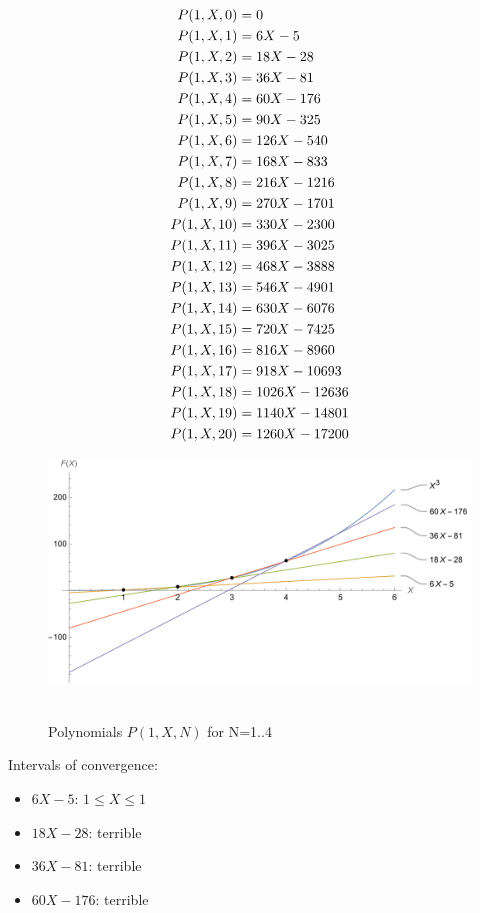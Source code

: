 ﻿\begin{align*}
    {P}(1,X,0) &= 0 \\
    {P}(1,X,1) &= 6X - 5 \\
    {P}(1,X,2) &= 18X - 28 \\
    {P}(1,X,3) &= 36X - 81 \\
    {P}(1,X,4) &= 60X - 176 \\
    {P}(1,X,5) &= 90X - 325 \\
    {P}(1,X,6) &= 126X - 540 \\
    {P}(1,X,7) &= 168X - 833 \\
    {P}(1,X,8) &= 216X - 1216 \\
    {P}(1,X,9) &= 270X - 1701 \\
    {P}(1,X,10) &= 330X - 2300 \\
    {P}(1,X,11) &= 396X - 3025 \\
    {P}(1,X,12) &= 468X - 3888 \\
    {P}(1,X,13) &= 546X - 4901 \\
    {P}(1,X,14) &= 630X - 6076 \\
    {P}(1,X,15) &= 720X - 7425 \\
    {P}(1,X,16) &= 816X - 8960 \\
    {P}(1,X,17) &= 918X - 10693 \\
    {P}(1,X,18) &= 1026X - 12636 \\
    {P}(1,X,19) &= 1140X - 14801 \\
    {P}(1,X,20) &= 1260X - 17200
\end{align*}
\begin{figure}[H]
    \centering
    \includegraphics[width=1\textwidth]{sections/images/01_plots_cubes_with_p1}
    ~\caption{Polynomials $P(1, X, N)$ for N=1..4}\label{fig:figure}
\end{figure}
Intervals of convergence:
\begin{itemize}
    \item $6X - 5$: $1 \leq X \leq 1$
    \item $18X - 28$: terrible
    \item $36X - 81$: terrible
    \item $60X - 176$: terrible
\end{itemize}
